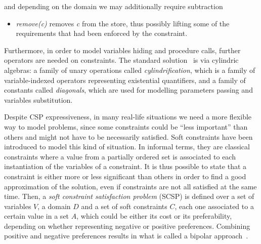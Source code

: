 \documentclass{llncs}
\begin{document}
\noindent
and depending on the domain we may additionally require subtraction

\begin{itemize}
	\item \emph{remove(c)} removes \emph{c} from the store, thus possibly lifting some of the requirements that had been enforced by the constraint. 
\end{itemize}

%

%
Furthermore, in order to model variables hiding and procedure calls, further operators are needed on constraints. 
%
The standard solution~\cite{popl91} is via cylindric algebras: a family of unary operations called \emph{cylindrification}, 
which is a family of variable-indexed operators representing existential quantifiers, and a family of constants called \emph{diagonals}, 
which are used for modelling parameters passing and variables substitution.

\smallskip
Despite CSP expressiveness,  
in many real-life situations we need a more flexible way to model problems, 
since some constraints could be ``less important'' than others and might not have to be necessarily satisfied.
%
Soft constraints have been introduced to model this kind of situation. In informal terms, they are classical constraints where a value from a partially ordered set is associated to each instantiation of the variables of a constraint. It is  thus possible to state that a constraint is either  more or less significant than others in order to find a good approximation of the solution, even if constraints are not all satisfied at the same time. 
%
Then, a \emph{soft constraint satisfaction problem} (SCSP) is defined over a set of variables $V$, a domain $D$ and a set of soft constraints $C$, each one associated to a certain value in a set $A$, which could be either its cost or its preferability, depending on whether representing negative or positive preferences. Combining positive and negative preferences results in what is called a bipolar approach~\cite{posneg}.
\end{document}

